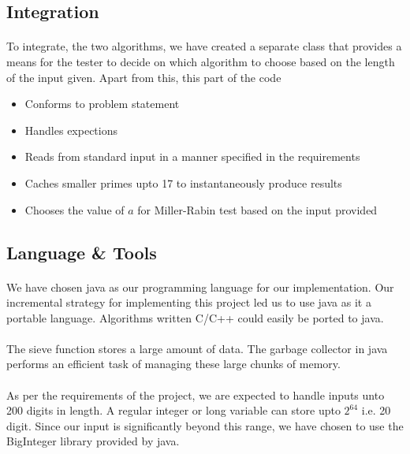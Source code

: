\documentclass[paper=a4, fontsize=11pt]{scrartcl}	%
\numberwithin{equation}{section}		%
\numberwithin{figure}{section}		%
\numberwithin{table}{section}		%
\begin{document}
\subsection{Integration}

\paragraph{}To integrate, the two algorithms, we have created a separate class that provides a means for the tester to decide on which algorithm to choose based on the length of the input given. Apart from this, this part of the code

\begin{itemize}
\item Conforms to problem statement
\item Handles expections
\item Reads from standard input in a manner specified in the requirements
\item Caches smaller primes upto 17 to instantaneously produce results
\item Chooses the value of $a$ for Miller-Rabin test based on the input provided
\end{itemize}

\subsection{Language \& Tools}
\paragraph{}We have chosen java as our programming language for our implementation. Our incremental strategy for implementing this project led us to use java as it a portable language. Algorithms written C/C++ could easily be ported to java. 
\paragraph{}The sieve function stores a large amount of data. The garbage collector in java performs an efficient task of managing these large chunks of memory.
\paragraph{}As per the requirements of the project, we are expected to handle inputs unto 200 digits in length. A regular integer or long variable can store upto $2^{64}$ i.e. 20 digit. Since our input is significantly beyond this range, we have chosen to use the BigInteger library provided by java.
\end{document}
